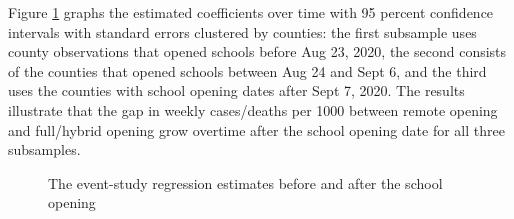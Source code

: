 \documentclass[9pt,twocolumn,twoside,lineno]{pnas-new}
\begin{document}
Figure \ref{fig:event} graphs the estimated coefficients over time with 95 percent confidence intervals with standard errors clustered by counties:  the first subsample uses county observations that opened schools before  Aug 23, 2020, the second consists of the counties that opened schools between Aug 24 and Sept 6, and the third uses the counties with school opening dates after Sept 7, 2020.   The results illustrate that the gap in weekly cases/deaths per 1000 between remote opening and full/hybrid opening grow overtime after the school opening date for all three subsamples. %

  \begin{figure}[!ht]
  \caption{The event-study regression estimates before and after the school opening\label{fig:event}}\vspace{-0.1cm}
\hspace*{-0.5cm}  
\end{figure}
\end{document}
